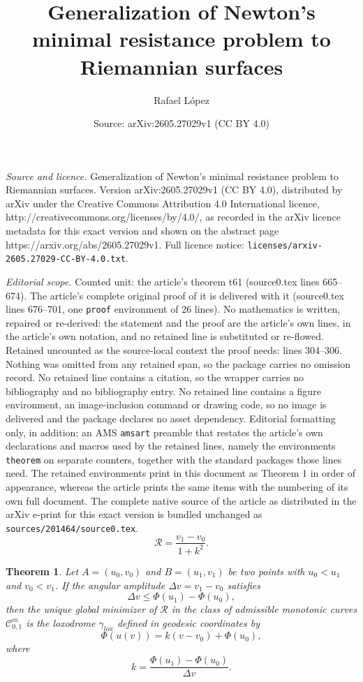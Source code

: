 \documentclass[10pt,a4paper]{amsart}
\title{Generalization of Newton's minimal resistance problem to Riemannian surfaces}
\author{Rafael L\'opez}
\date{Source: arXiv:2605.27029v1 (CC BY 4.0)}
\newtheorem{theorem}{Theorem}
\begin{document}
\maketitle

\noindent\emph{Source and licence.} Generalization of Newton's minimal resistance problem to Riemannian surfaces. Version arXiv:2605.27029v1 (CC BY 4.0), distributed by arXiv under the Creative Commons Attribution 4.0 International licence, http://creativecommons.org/licenses/by/4.0/, as recorded in the arXiv licence metadata for this exact version and shown on the abstract page https://arxiv.org/abs/2605.27029v1. Full licence notice: \texttt{licenses/arxiv-2605.27029-CC-BY-4.0.txt}.\par\smallskip

\noindent\textit{Editorial scope.} Counted unit: the article's theorem t61 (source0.tex lines 665--674). The article's complete original proof of it is delivered with it (source0.tex lines 676--701, one \texttt{proof} environment of 26 lines). No mathematics is written, repaired or re-derived: the statement and the proof are the article's own lines, in the article's own notation, and no retained line is substituted or re-flowed.  Retained uncounted as the source-local context the proof needs: lines 304--306.  Nothing was omitted from any retained span, so the package carries no omission record.  No retained line contains a citation, so the wrapper carries no bibliography and no bibliography entry.  No retained line contains a figure environment, an image-inclusion command or drawing code, so no image is delivered and the package declares no asset dependency.  Editorial formatting only, in addition: an AMS \texttt{amsart} preamble that restates the article's own declarations and macros used by the retained lines, namely the environments \texttt{theorem} on separate counters, together with the standard packages those lines need.  The retained environments print in this document as Theorem 1 in order of appearance, whereas the article prints the same items with the numbering of its own full document.  The complete native source of the article as distributed in the arXiv e-print for this exact version is bundled unchanged as \texttt{sources/201464/source0.tex}.
\begin{equation}\label{r5}
\mathcal{R}=\frac{v_1-v_0}{1+k^2}.
\end{equation}

 \begin{theorem} \label{t61}
 Let  $A=(u_0, v_0)$ and $B=(u_1, v_1)$ be two points with $u_0 < u_1$ and $v_0<v_1$. If the angular amplitude $\Delta v = v_1 - v_0$ satisfies 
\begin{equation}
\Delta v \le \Phi(u_1) - \Phi(u_0),
\end{equation}
then the unique global minimizer of $\mathcal{R}$ in the class of admissible monotonic curves $\mathcal{C}_{0,1}^{m}$ is the loxodrome $\gamma_{lox}$ defined in geodesic coordinates by 
$$\Phi(u(v)) = k(v-v_0)+\Phi(u_0),$$
 where 
$$k = \frac{\Phi(u_1) - \Phi(u_0)}{\Delta v}.$$
\end{theorem}
\end{document}
